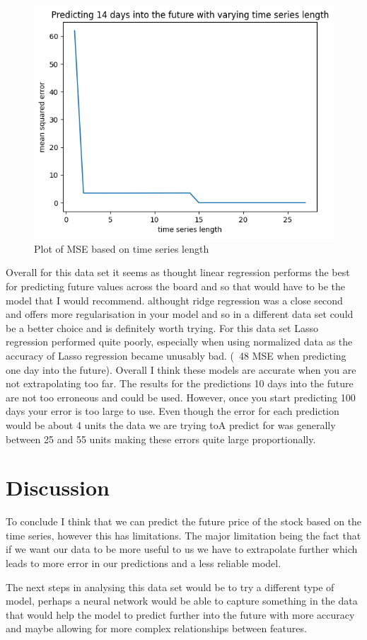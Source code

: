 \documentclass{report}
\begin{document}
\begin{figure}
    \caption{Plot of MSE based on time series length}
    \centering
    \includegraphics[scale=0.5]{varying_length_plot.png}
\end{figure}

Overall for this data set it seems as thought linear regression performs the best for predicting future values across the board and so that would have to be the model that I would recommend. althought ridge regression was a close second and offers more regularisation in your model and so in a different data set could be a better choice and is definitely worth trying.
For this data set Lasso regression performed quite poorly, especially when using normalized data as the accuracy of Lasso regression became unusably bad. (~48 MSE when predicting one day into the future).
Overall I think these models are accurate when you are not extrapolating too far. The results for the predictions 10 days into the future are not too erroneous and could be used. However, once you start predicting 100 days your error is too large to use. Even though the error for each prediction would be about 4 units the data we are trying toA predict for was generally between 25 and 55 units making these errors quite large proportionally.

\section{Discussion}

To conclude I think that we can predict the future price of the stock based on the time series, however this has limitations. The major limitation being the fact that if we want our data to be more useful to us we have to extrapolate further which leads to more error in our predictions and a less reliable model.

The next steps in analysing this data set would be to try a different type of model, perhaps a neural network would be able to capture something in the data that would help the model to predict further into the future with more accuracy and maybe allowing for more complex relationships between features.
\end{document}
